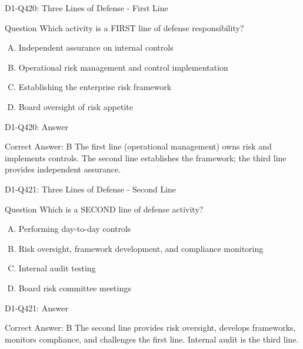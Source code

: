 \documentclass{beamer}
\begin{document}
\begin{frame}{D1-Q420: Three Lines of Defense - First Line}
	\begin{block}{Question}
		Which activity is a FIRST line of defense responsibility?
	\end{block}
	\begin{enumerate}[(A)]
		\item Independent assurance on internal controls
		\item Operational risk management and control implementation
		\item Establishing the enterprise risk framework
		\item Board oversight of risk appetite
	\end{enumerate}
\end{frame}
\begin{frame}{D1-Q420: Answer}
	\begin{block}{Correct Answer: B}
		The first line (operational management) owns risk and implements controls. The second line establishes the framework; the third line provides independent assurance.
	\end{block}
\end{frame}

\begin{frame}{D1-Q421: Three Lines of Defense - Second Line}
	\begin{block}{Question}
		Which is a SECOND line of defense activity?
	\end{block}
	\begin{enumerate}[(A)]
		\item Performing day-to-day controls
		\item Risk oversight, framework development, and compliance monitoring
		\item Internal audit testing
		\item Board risk committee meetings
	\end{enumerate}
\end{frame}
\begin{frame}{D1-Q421: Answer}
	\begin{block}{Correct Answer: B}
		The second line provides risk oversight, develops frameworks, monitors compliance, and challenges the first line. Internal audit is the third line.
	\end{block}
\end{frame}
\end{document}

